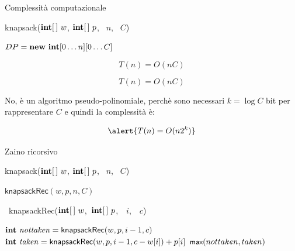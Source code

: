 \begin{frame}[fragile]{Complessità computazionale}


\begin{overprint}
\begingroup
\footnotesize
\begin{Procedure}
\caption[A]{\textsf{knapsack}($\INTEGER[\,]\ w$, $\INTEGER[\,]\ p$, \INTEGER\ $n$, \INTEGER\ $C$)}

$DP = \NEW\ \INTEGER[0 \ldots n][0 \ldots C]$\;
\end{Procedure}
\endgroup
{}
\[ 
  T(n) = O(nC)
\]


\[ 
  T(n) = O(nC)
\]


\medskip
No, è un algoritmo \alert{pseudo-polinomiale}, perchè sono necessari \alert{$k = \log C$} bit
per rappresentare $C$ e quindi la complessità è:

\[
  \alert{T(n) = O(n 2^k) }
\]
\end{overprint}

\end{frame}


\begin{frame}{Zaino ricorsivo}

\vspace{-12pt}
\begin{Procedure}
\caption[A]{\textsf{knapsack}($\INTEGER[\,]\ w$, $\INTEGER[\,]\ p$, \INTEGER\ $n$, \INTEGER\ $C$)}
\Return $\textsf{knapsackRec}(w, p, n, C)$
\end{Procedure}

\vspace{-12pt}
\begin{Procedure}
\caption[A]{\INTEGER\ \textsf{knapsackRec}($\INTARRAY\ w$,\ $\INTARRAY\ p$,\  \INTEGER\ $i$,\ \INTEGER\ $c$)}

$\INTEGER\ \mathit{nottaken} = \textsf{knapsackRec}(w,p, i-1, c)$\;
$\INTEGER\ \mathit{taken} = \textsf{knapsackRec}(w,p,i-1,c-w[i])+p[i]$\;
\Return $\textsf{{\small max}}(nottaken, taken)$\;
\end{Procedure}



\end{frame}


